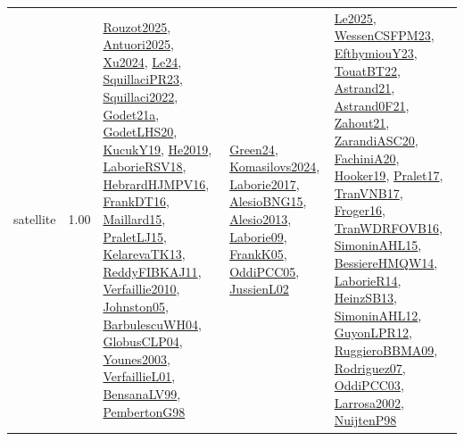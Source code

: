 {\begin{longtable}{p{3cm}r>{\raggedright\arraybackslash}p{6cm}>{\raggedright\arraybackslash}p{6cm}>{\raggedright\arraybackslash}p{8cm}}
\index{satellite}\index{ApplicationAreas!satellite}satellite &  1.00 & \hyperref[detail:Rouzot2025]{Rouzot2025}, \hyperref[detail:Antuori2025]{Antuori2025}, \hyperref[detail:Xu2024]{Xu2024}, \hyperref[detail:Le24]{Le24}, \hyperref[detail:SquillaciPR23]{SquillaciPR23}, \hyperref[detail:Squillaci2022]{Squillaci2022}, \hyperref[detail:Godet21a]{Godet21a}, \hyperref[detail:GodetLHS20]{GodetLHS20}, \hyperref[detail:KucukY19]{KucukY19}, \hyperref[detail:He2019]{He2019}, \hyperref[detail:LaborieRSV18]{LaborieRSV18}, \hyperref[detail:HebrardHJMPV16]{HebrardHJMPV16}, \hyperref[detail:FrankDT16]{FrankDT16}, \hyperref[detail:Maillard15]{Maillard15}, \hyperref[detail:PraletLJ15]{PraletLJ15}, \hyperref[detail:KelarevaTK13]{KelarevaTK13}, \hyperref[detail:ReddyFIBKAJ11]{ReddyFIBKAJ11}, \hyperref[detail:Verfaillie2010]{Verfaillie2010}, \hyperref[detail:Johnston05]{Johnston05}, \hyperref[detail:BarbulescuWH04]{BarbulescuWH04}, \hyperref[detail:GlobusCLP04]{GlobusCLP04}, \hyperref[detail:Younes2003]{Younes2003}, \hyperref[detail:VerfaillieL01]{VerfaillieL01}, \hyperref[detail:BensanaLV99]{BensanaLV99}, \hyperref[detail:PembertonG98]{PembertonG98} & \hyperref[detail:Green24]{Green24}, \hyperref[detail:Komasilovs2024]{Komasilovs2024}, \hyperref[detail:Laborie2017]{Laborie2017}, \hyperref[detail:AlesioBNG15]{AlesioBNG15}, \hyperref[detail:Alesio2013]{Alesio2013}, \hyperref[detail:Laborie09]{Laborie09}, \hyperref[detail:FrankK05]{FrankK05}, \hyperref[detail:OddiPCC05]{OddiPCC05}, \hyperref[detail:JussienL02]{JussienL02} & \hyperref[detail:Le2025]{Le2025}, \hyperref[detail:WessenCSFPM23]{WessenCSFPM23}, \hyperref[detail:EfthymiouY23]{EfthymiouY23}, \hyperref[detail:TouatBT22]{TouatBT22}, \hyperref[detail:Astrand21]{Astrand21}, \hyperref[detail:Astrand0F21]{Astrand0F21}, \hyperref[detail:Zahout21]{Zahout21}, \hyperref[detail:ZarandiASC20]{ZarandiASC20}, \hyperref[detail:FachiniA20]{FachiniA20}, \hyperref[detail:Hooker19]{Hooker19}, \hyperref[detail:Pralet17]{Pralet17}, \hyperref[detail:TranVNB17]{TranVNB17}, \hyperref[detail:Froger16]{Froger16}, \hyperref[detail:TranWDRFOVB16]{TranWDRFOVB16}, \hyperref[detail:SimoninAHL15]{SimoninAHL15}, \hyperref[detail:BessiereHMQW14]{BessiereHMQW14}, \hyperref[detail:LaborieR14]{LaborieR14}, \hyperref[detail:HeinzSB13]{HeinzSB13}, \hyperref[detail:SimoninAHL12]{SimoninAHL12}, \hyperref[detail:GuyonLPR12]{GuyonLPR12}, \hyperref[detail:RuggieroBBMA09]{RuggieroBBMA09}, \hyperref[detail:Rodriguez07]{Rodriguez07}, \hyperref[detail:OddiPCC03]{OddiPCC03}, \hyperref[detail:Larrosa2002]{Larrosa2002}, \hyperref[detail:NuijtenP98]{NuijtenP98}\\

\end{longtable}}

